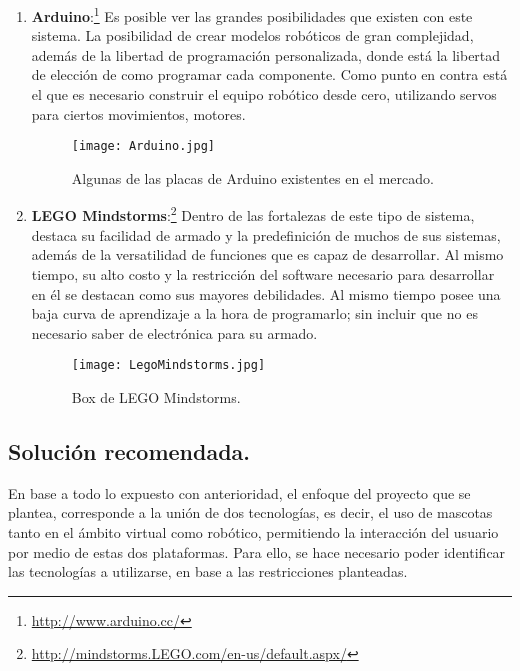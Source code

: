 \begin{enumerate}
  \begin{enumerate}
  \item {\bf Arduino}:\footnote{\url{http://www.arduino.cc/}} Es posible ver las grandes posibilidades que existen con este sistema. La posibilidad de crear modelos rob\'oticos de gran complejidad, adem\'as de la libertad de programaci\'on personalizada, donde est\'a la libertad de elecci\'on de como programar cada componente. Como punto en contra est\'a el que es necesario construir el equipo rob\'otico desde cero, utilizando servos para ciertos movimientos, motores.
\begin{figure}[H]
  \centering
  \texttt{[image: Arduino.jpg]}
  \caption{Algunas de las placas de Arduino existentes en el mercado.}
  \label{fig:LegoMindstorms}
\end{figure}

  \item {\bf LEGO Mindstorms}:\footnote{\url{http://mindstorms.LEGO.com/en-us/default.aspx/}} Dentro de las fortalezas de este tipo de sistema, destaca su facilidad de armado y la predefinici\'on de muchos de sus sistemas, adem\'as de la versatilidad de funciones que es capaz de desarrollar. Al mismo tiempo, su alto costo y la restricci\'on del software necesario para desarrollar en \'el se destacan como sus mayores debilidades. Al mismo tiempo posee una baja curva de aprendizaje a la hora de programarlo; sin incluir que no es necesario saber de electr\'onica para su armado.
\begin{figure}[H]
  \centering
  \texttt{[image: LegoMindstorms.jpg]}
  \caption{Box de LEGO Mindstorms.}
  \label{fig:LegoMindstorms}
\end{figure}

  \end{enumerate}
\end{enumerate}

\newpage
\subsection{Soluci\'on recomendada.}

En base a todo lo expuesto con anterioridad, el enfoque del proyecto que se plantea, corresponde a la uni\'on de dos tecnolog\'ias, es decir, el uso de mascotas tanto en el \'ambito virtual como rob\'otico, permitiendo la interacci\'on del usuario por medio de estas dos plataformas. Para ello, se hace necesario poder identificar las tecnolog\'ias a utilizarse, en base a las restricciones planteadas.

